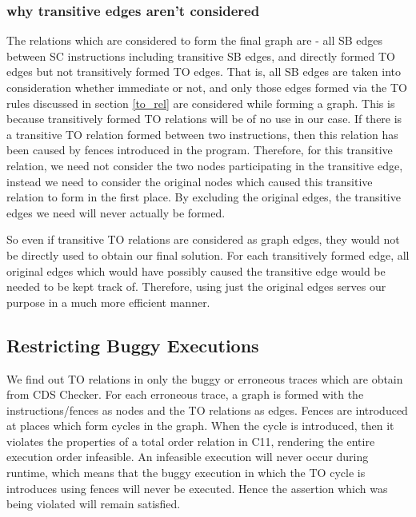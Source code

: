 \subsubsection{why transitive edges aren't considered}
The relations which are considered to form the final graph are - all SB edges between SC instructions including transitive SB edges, and directly formed TO edges but not transitively formed TO edges. That is, all SB edges are taken into consideration whether immediate or not, and only those edges formed via the TO rules discussed in section \ref{to_rel} are considered while forming a graph. This is because transitively formed TO relations will be of no use in our case. If there is a transitive TO relation formed between two instructions, then this relation has been caused by fences introduced in the program. Therefore, for this transitive relation, we need not consider the two nodes participating in the transitive edge, instead we need to consider the original nodes which caused this transitive relation to form in the first place. By excluding the original edges, the transitive edges we need will never actually be formed.

\par
So even if transitive TO relations are considered as graph edges, they would not be directly used to obtain our final solution. For each transitively formed edge, all original edges which would have possibly caused the transitive edge would be needed to be kept track of. Therefore, using just the original edges serves our purpose in a much more efficient manner.

\subsection{Restricting Buggy Executions}
\par
We find out TO relations in only the buggy or erroneous traces which are obtain from CDS Checker. For each erroneous trace, a graph is formed with the instructions/fences as nodes and the TO relations as edges. Fences are introduced at places which form cycles in the graph. When the cycle is introduced, then it violates the properties of a total order relation in C11, rendering the entire execution order infeasible. An infeasible execution will never occur during runtime, which means that the buggy execution in which the TO cycle is introduces using fences will never be executed. Hence the assertion which was being violated will remain satisfied. 

